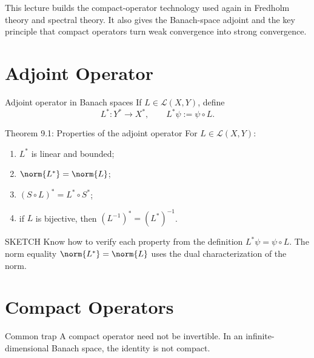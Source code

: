 \documentclass[header={Lecture 7 Exam Study Notes}]{study-note}
\begin{document}

\vspace{0.8em}

\begin{focusbox}
This lecture builds the compact-operator technology used again in Fredholm theory and spectral theory. It also gives the Banach-space adjoint and the key principle that compact operators turn weak convergence into strong convergence.
\end{focusbox}

\tableofcontents

\section{Adjoint Operator}

\begin{defbox}{Adjoint operator in Banach spaces}
If $L\in\mathcal L(X,Y)$, define
\[
L^*:Y^*\to X^*,
\qquad
L^*\psi:=\psi\circ L.
\]
\end{defbox}

\begin{thmbox}{Theorem 9.1: Properties of the adjoint operator}
For $L\in\mathcal L(X,Y)$:
\begin{enumerate}
\item $L^*$ is linear and bounded;
\item $\norm{L^*}=\norm{L}$;
\item $(S\circ L)^*=L^*\circ S^*$;
\item if $L$ is bijective, then $(L^{-1})^*=(L^*)^{-1}$.
\end{enumerate}
\end{thmbox}

\begin{prooflevelbox}{SKETCH}
Know how to verify each property from the definition $L^*\psi=\psi\circ L$. The norm equality $\norm{L^*}=\norm{L}$ uses the dual characterization of the norm.
\end{prooflevelbox}

\section{Compact Operators}

\begin{warningbox}{Common trap}
A compact operator need not be invertible. In an infinite-dimensional Banach space, the identity is not compact.
\end{warningbox}
\end{document}
